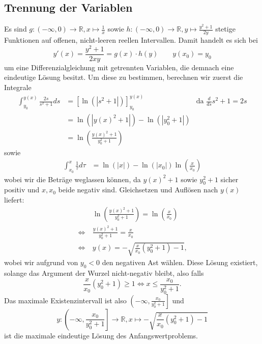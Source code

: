 \documentclass[a4paper]{article}
\begin{document}
\makeexheader

\subsection{Trennung der Variablen}

Es sind $g: (-\infty, 0) \to \mathds{R}, x \mapsto \frac{1}{x}$ sowie $h: (-\infty, 0) \to \mathds{R}, y \mapsto \frac{y^2+1}{2y}$ stetige Funktionen auf offenen, nicht-leeren reellen Intervallen. Damit handelt es sich bei
\begin{equation*}
	y'(x) = \frac{y^2 + 1}{2xy} = g(x) \cdot h(y) \qquad y(x_0) = y_0
\end{equation*}
um eine Differenzialgleichung mit getrennten Variablen, die demnach eine eindeutige Lösung besitzt. Um diese zu bestimmen, berechnen wir zuerst die Integrale
\begin{align*}
	\int_{y_0}^{y(x)} \frac{2s}{s^2 + 1} ds & = \left[ \ln(|s^2 + 1|) \right]_{y_0}^{y(x)}   & \text{da } \frac{d}{ds} s^2 + 1 = 2s \\
	                                        & = \ln(|y(x)^2 + 1|) - \ln(|y_0^2 + 1|)                                                \\
	                                        & = \ln\left(\frac{y(x)^2 + 1}{y_0^2 + 1}\right)
\end{align*}
sowie
\begin{align*}
	\int_{x_0}^{x} \frac{1}{\tau} d\tau & = \ln(|x|) - \ln(|x_0|) \ln\left(\frac{x}{x_0}\right)
\end{align*}
wobei wir die Beträge weglassen können, da $y(x)^2 + 1$ sowie $y_0^2 + 1$ sicher positiv und $x,x_0$ beide negativ sind. Gleichsetzen und Auflösen nach $y(x)$ liefert:
\begin{align*}
	       & \ln\left(\frac{y(x)^2 + 1}{y_0^2 + 1}\right) = \ln\left(\frac{x}{x_0}\right) \\
	\iff\  & \frac{y(x)^2 + 1}{y_0^2 + 1} = \frac{x}{x_0}                                 \\
	\iff\  & y(x) = - \sqrt{\frac{x}{x_0} (y_0^2 + 1) - 1}\text{,}
\end{align*}
wobei wir aufgrund von $y_0 < 0$ den negativen Ast wählen. Diese Lösung existiert, solange das Argument der Wurzel nicht-negativ bleibt, also falls
\begin{equation*}
	\frac{x}{x_0} (y_0^2 + 1) \geq 1 \iff x \leq \frac{x_0}{y_0^2 + 1}\text{.}
\end{equation*}
Das maximale Existenzintervall ist also $\left(-\infty, \frac{x_0}{y_0^2 + 1}\right]$ und
\begin{equation*}
	y: \left(-\infty, \frac{x_0}{y_0^2 + 1}\right] \to \mathds{R}, x \mapsto  -\sqrt{\frac{x}{x_0} (y_0^2 + 1) - 1}
\end{equation*}
ist die maximale eindeutige Lösung des Anfangswertproblems.
\end{document}
